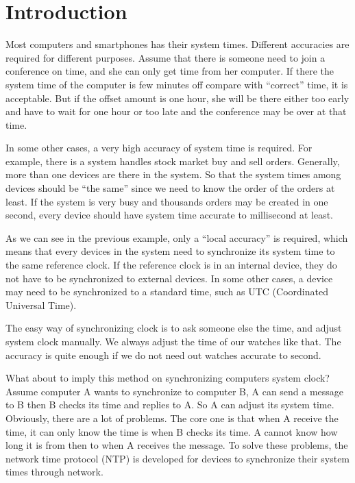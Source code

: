 

\chapter{Introduction}
Most computers and smartphones has their system times. Different accuracies are
required for different purposes. 
Assume that there is someone need to join a conference on time, and she can
only get time from her computer. If there the system time of the computer is
few minutes off compare with ``correct'' time, it is acceptable. But if the
offset amount is one hour, she will be there either too early and have to
wait for one hour or too late and the conference may be over at that time.

In some other cases, a very high accuracy of system time is required. For
example, there is a system handles stock market buy and sell orders. Generally,
more than one devices are there in the system. So that the system times among
devices should be ``the same'' since we need to know the order of the orders at
least. If the system is very busy and thousands orders may be created in one
second, every device should have system time accurate to millisecond at least.

As we can see in the previous example, only a ``local accuracy'' is required,
which means that every devices in the system need to synchronize its system
time to the same reference clock. If the reference clock is in an internal
device, they do not have to be synchronized to external devices. In some other
cases, a device may need to be synchronized to a standard time, such as UTC
(Coordinated Universal Time).  

The easy way of synchronizing clock is to ask someone else the time, and
adjust system clock manually. We always adjust the time of our
watches like that. The accuracy is quite enough if we do not need out watches
accurate to second. 

What about to imply this method on synchronizing computers system clock? Assume
computer A wants to synchronize to computer B, A can send a message to B then B
checks its time and replies to A. So A can adjust its system time.  
Obviously, there are a lot of problems.  The core one is that when A receive
the time, it can only know the time is when B checks its time. A cannot know
how long it is from then to when A receives the message. To solve these
problems, the network time protocol (NTP) is developed for devices to
synchronize their system times through network. 

